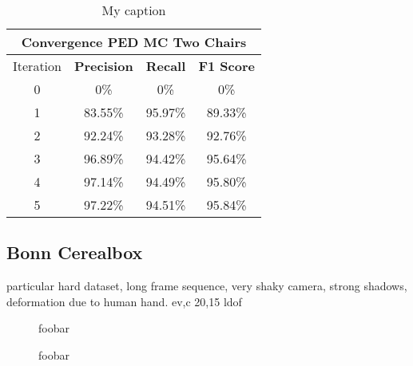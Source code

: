 \begin{table}[H]
\centering
\begin{tabular}{|c|c|c|c|}
\hline
\multicolumn{4}{|c|}{Convergence PED MC Two Chairs}                        \\ \hline
Iteration & \textbf{Precision} & \textbf{Recall} & \textbf{F1 Score} \\ \hline
0 & 0\%   & 0\%     & 0\%  \\ \hline
1 & 83.55\%   & 95.97\%     & 89.33\%  \\ \hline
2 & 92.24\%   & 93.28\%     & 92.76\%  \\ \hline 
3 & 96.89\%   & 94.42\%     & 95.64\%  \\ \hline
4 & 97.14\%   & 94.49\%     & 95.80\%  \\ \hline
5 & 97.22\%   & 94.51\%     & 95.84\%  \\ \hline               
\end{tabular}
\caption[Convergence PED MC]{My caption}
\label{tab:two_chairs_ped_mc_iterations}
\end{table}

\subsection{Bonn Cerealbox}
particular hard dataset, long frame sequence, very shaky camera, strong shadows, deformation due to human hand.
ev,c
20,15
ldof

\begin{figure}[H]
\begin{center}
\end{center}
\caption[Bonn Cerealbox Dataset]{foobar}
\label{fix:bonn_cerealbox_ds}
\end{figure}

\begin{figure}[H]
\begin{center}
\end{center}
\caption[Bonn Cerealbox Segmentations]{foobar}
\label{fix:bonn_cerealbox_segmentations_mc_methods}
\end{figure}


